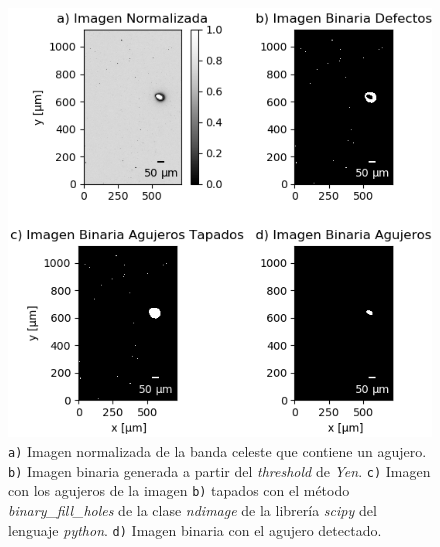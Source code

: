 \begin{figure}[H]
\centering
\includegraphics[scale=1.5]{Figs/defectosZEISS/algor_defecs.png}
\caption{\texttt{a)} Imagen normalizada de la banda celeste que contiene un agujero.  \texttt{b)} Imagen binaria generada a partir del \textit{threshold} de \textit{Yen}. \texttt{c)} Imagen con los agujeros de la imagen \texttt{b)} tapados con el método \textit{binary\_fill\_holes} de la clase \textit{ndimage} de la librería \textit{scipy} del lenguaje \textit{python}. \texttt{d)} Imagen binaria con el agujero detectado.}
\label{fig:flujoalgo}
\end{figure} 

